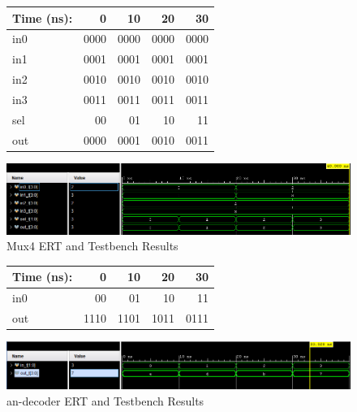 \documentclass[11pt]{article}
\begin{document}
\begin{figure}[ht]\centering
	\begin{tabular}{l|rrrr}
		Time (ns): & 0 & 10 & 20 & 30 \\
		\midrule
		in0 & 0000 & 0000 & 0000 & 0000 \\
		in1 & 0001 & 0001 & 0001 & 0001 \\
		in2 & 0010 & 0010 & 0010 & 0010 \\
		in3 & 0011 & 0011 & 0011 & 0011 \\
		sel & 00 & 01 & 10 & 11 \\
		\midrule
		out & 0000 & 0001 & 0010 & 0011 \\
		\bottomrule
	\end{tabular}\medskip
	
	\includegraphics[width=1.1\textwidth]{mux4sim.png}
	\caption{Mux4 ERT and Testbench Results}
	\label{fig:sim_with_table}
\end{figure}

\begin{figure}[ht]\centering
	\begin{tabular}{l|rrrr}
		Time (ns): & 0 & 10 & 20 & 30 \\
		\midrule
		in0 & 00 & 01 & 10 & 11 \\
		\midrule
		out & 1110 & 1101 & 1011 & 0111 \\
		\bottomrule
	\end{tabular}\medskip

	\includegraphics[width=1.1\textwidth]{an_decodesim.png}
	\caption{an-decoder ERT and Testbench Results}
	\label{fig:sim_with_table}
\end{figure}
\clearpage
\end{document}
